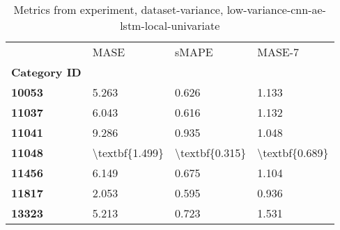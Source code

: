 \begin{table}[h]
\centering
\caption{Metrics from experiment, dataset-variance, low-variance-cnn-ae-lstm-local-univariate}
\label{table:low-variance-cnn-ae-lstm-local-univariate-dataset-variance}
\begin{tabular}{llll}
\toprule
{} &            MASE &           sMAPE &          MASE-7 \\
\textbf{Category ID} &                 &                 &                 \\
\midrule
\textbf{10053      } &           5.263 &           0.626 &           1.133 \\
\textbf{11037      } &           6.043 &           0.616 &           1.132 \\
\textbf{11041      } &           9.286 &           0.935 &           1.048 \\
\textbf{11048      } &  \textbackslash textbf\{1.499\} &  \textbackslash textbf\{0.315\} &  \textbackslash textbf\{0.689\} \\
\textbf{11456      } &           6.149 &           0.675 &           1.104 \\
\textbf{11817      } &           2.053 &           0.595 &           0.936 \\
\textbf{13323      } &           5.213 &           0.723 &           1.531 \\
\bottomrule
\end{tabular}
\end{table}
